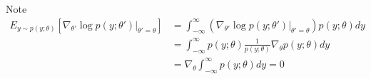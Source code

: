 \begin{answer}
    Note
    $$
    \begin{aligned}
        E_{y\sim p(y;\theta)}[\nabla_{\theta'}\log p(y;\theta')|_{\theta' = \theta}] &= \int_{-\infty}^{\infty}(\nabla_{\theta'}\log p(y;\theta')|_{\theta' = \theta}) p(y;\theta)dy \\
        &= \int_{-\infty}^{\infty}p(y;\theta)\frac{1}{p(y;\theta)} \nabla_\theta p(y;\theta)dy\\
        &= \nabla_\theta \int_{-\infty}^{\infty}p(y;\theta)dy = 0
    \end{aligned}
    $$

\end{answer}
